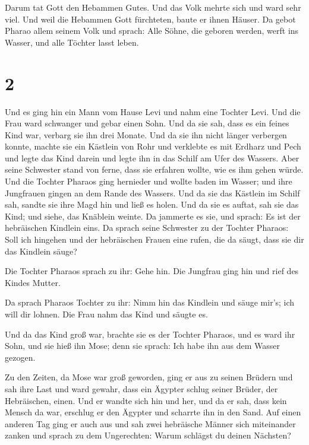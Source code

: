  Darum tat Gott den Hebammen Gutes. Und das Volk mehrte
sich und ward sehr viel.  Und weil die Hebammen Gott
fürchteten, baute er ihnen Häuser.  Da gebot Pharao allem
seinem Volk und sprach: Alle Söhne, die geboren werden, werft ins
Wasser, und alle Töchter lasst leben.

\hypertarget{section-1}{%
\section{2}\label{section-1}}

 Und es ging hin ein Mann vom Hause Levi und nahm eine
Tochter Levi.  Und die Frau ward schwanger und gebar einen
Sohn. Und da sie sah, dass es ein feines Kind war, verbarg sie ihn drei
Monate.  Und da sie ihn nicht länger verbergen konnte,
machte sie ein Kästlein von Rohr und verklebte es mit Erdharz und Pech
und legte das Kind darein und legte ihn in das Schilf am Ufer des
Wassers.  Aber seine Schwester stand von ferne, dass sie
erfahren wollte, wie es ihm gehen würde.  Und die Tochter
Pharaos ging hernieder und wollte baden im Wasser; und ihre Jungfrauen
gingen an dem Rande des Wassers. Und da sie das Kästlein im Schilf sah,
sandte sie ihre Magd hin und ließ es holen.  Und da sie es
auftat, sah sie das Kind; und siehe, das Knäblein weinte. Da jammerte es
sie, und sprach: Es ist der hebräischen Kindlein eins.  Da
sprach seine Schwester zu der Tochter Pharaos: Soll ich hingehen und der
hebräischen Frauen eine rufen, die da säugt, dass sie dir das Kindlein
säuge?

 Die Tochter Pharaos sprach zu ihr: Gehe hin. Die Jungfrau
ging hin und rief des Kindes Mutter.

 Da sprach Pharaos Tochter zu ihr: Nimm hin das Kindlein
und säuge mir's; ich will dir lohnen. Die Frau nahm das Kind und säugte
es.

 Und da das Kind groß war, brachte sie es der Tochter
Pharaos, und es ward ihr Sohn, und sie hieß ihn Mose; denn sie sprach:
Ich habe ihn aus dem Wasser gezogen.

 Zu den Zeiten, da Mose war groß geworden, ging er aus zu
seinen Brüdern und sah ihre Last und ward gewahr, dass ein Ägypter
schlug seiner Brüder, der Hebräischen, einen.  Und er
wandte sich hin und her, und da er sah, dass kein Mensch da war,
erschlug er den Ägypter und scharrte ihn in den Sand. 
Auf einen anderen Tag ging er auch aus und sah zwei hebräische Männer
sich miteinander zanken und sprach zu dem Ungerechten: Warum schlägst du
deinen Nächsten?

